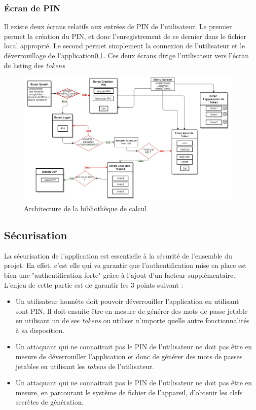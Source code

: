 \subsubsection{Écran de PIN}
Il existe deux écrans relatifs aux entrées de PIN de l'utilisateur. Le premier permet la création
du PIN, et donc l'enregistrement de ce dernier dans le fichier local approprié. Le second permet
simplement la connexion de l'utilisateur et le déverrouillage de l'application\ref{secu}. Ces deux
écrans dirige l'utilisateur vers l'écran de listing des \emph{tokens}


\begin{figure}
  \centering
  \includegraphics[scale=0.4]{../graphics/archi-android.jpg}
  \caption{Architecture de la bibliothèque de calcul}
  \label{fig:umlLib}
\end{figure}

\subsection{Sécurisation}
\label{secu}
La sécurisation de l'application est essentielle à la sécurité de l'ensemble du projet. En
effet, c'est elle qui va garantir que l'authentification mise en place est bien une
"authentification forte" grâce à l'ajout d'un facteur supplémentaire. L'enjeu de cette
partie est de garantir les 3 points suivant :


\begin{itemize}
  \item[1 -] Un utilisateur honnête doit pouvoir déverrouiller l'application en utilisant
  sont PIN. Il doit ensuite être en mesure de générer des mots de passe jetable en utilisant
  un de ses \emph{tokens} ou utiliser n'importe quelle autre fonctionnalités à sa
  disposition.
  \item[2 -] Un attaquant qui ne connaitrait pas le PIN de l'utilisateur ne doit pas être en
  mesure de déverrouiller l'application et donc de générer des mots de passes jetables en
  utilisant les \emph{tokens} de l'utilisateur.
  \item[3 -] Un attaquant qui ne connaitrait pas le PIN de l'utilisateur ne doit pas être en
  mesure, en parcourant le système de fichier de l'appareil, d'obtenir les clefs secrètes
  de génération.
\end{itemize}

